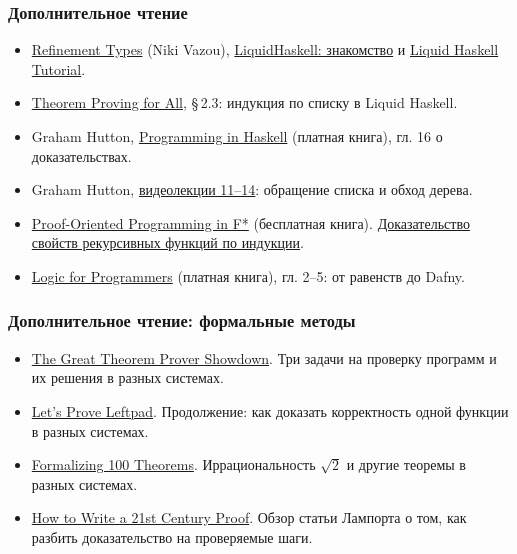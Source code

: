 \documentclass[11pt]{beamer}
\begin{document}
\begin{frame}
  \frametitle{Дополнительное чтение}
  \small
  \begin{itemize}
    \setlength{\itemsep}{1pt}
    \item \href{https://nikivazou.github.io/floc26/Lecture_01_RefinementTypes.html}{Refinement Types} (Niki Vazou), \href{https://ruhaskell.org/posts/utils/2016/12/16/liquidhaskell-hello.html}{LiquidHaskell: знакомство} и \href{https://liquid.kosmikus.org/}{Liquid Haskell Tutorial}.
    \item \href{https://doi.org/10.1145/3242744.3242756}{Theorem Proving for All}, \S\,2.3: индукция по списку в Liquid Haskell.
    \item Graham Hutton, \href{https://people.cs.nott.ac.uk/pszgmh/pih.html}{Programming in Haskell} (платная книга), гл. 16 о доказательствах.
    \item Graham Hutton, \href{https://people.cs.nott.ac.uk/pszgmh/afp.html}{видеолекции 11--14}: обращение списка и обход дерева.
    \item \href{https://fstar-lang.org/tutorial/book/}{Proof-Oriented Programming in F*} (бесплатная книга). \href{https://fstar-lang.org/tutorial/book/part1/part1_lemmas.html}{Доказательство свойств рекурсивных функций по индукции}.
    \item \href{https://logicforprogrammers.com/}{Logic for Programmers} (платная книга), гл. 2--5: от равенств до Dafny.
  \end{itemize}
\end{frame}
\begin{frame}
  \frametitle{Дополнительное чтение: формальные методы}
  \small
  \begin{itemize}
    \item \href{https://www.hillelwayne.com/post/theorem-prover-showdown/}{The Great Theorem Prover Showdown}. Три задачи на проверку программ и их решения в разных системах.
    \item \href{https://www.hillelwayne.com/post/lpl/}{Let's Prove Leftpad}. Продолжение: как доказать корректность одной функции в разных системах.
    \item \href{https://www.cs.ru.nl/~freek/100/}{Formalizing 100 Theorems}. Иррациональность $\sqrt{2}$ и другие теоремы в разных системах.
    \item \href{https://blog.acolyer.org/2015/01/12/how-to-write-a-21st-century-proof/}{How to Write a 21st Century Proof}. Обзор статьи Лампорта о том, как разбить доказательство на проверяемые шаги.
  \end{itemize}
\end{frame}
\end{document}
